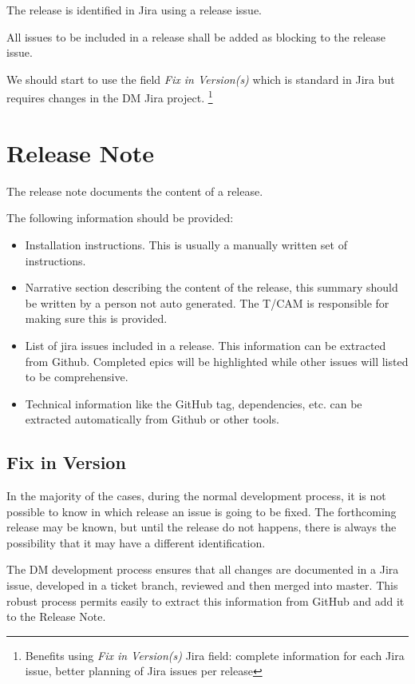 The release is identified in Jira using a release issue.

All issues to be included in a release shall be added as blocking to the release issue.

We should start to  use the field \textit{Fix in Version(s)} which is standard in Jira
but requires changes in the DM Jira project.
\footnote{Benefits using \textit{Fix in Version(s)} Jira field: complete information for each Jira issue, better planning of Jira issues per release}


\newpage
\section{Release Note} \label{sec:relnote}

The release note documents the content of a release.

The following information should be  provided:
\begin{itemize}
\item Installation instructions. This is usually a manually written set of instructions.
\item Narrative section describing the content of the release, this summary should be written by a person not auto generated.
The T/CAM is responsible for making sure this is provided.
\item List of jira issues included in a release. This information can be extracted from Github. Completed epics will be highlighted while other issues will  listed to be comprehensive.
\item Technical information like the GitHub tag, dependencies,  etc. can be extracted automatically from Github or other tools.
\end{itemize}

\subsection{Fix in Version} \label{sec:fixinver}

In the majority of the cases, during the normal development process, it is not possible to know in which release an issue is going to be fixed.
The forthcoming release may be known, but until the release do not happens, there is always the possibility that it may have a different identification.

The DM development process ensures that all changes are documented in a Jira issue, developed in a ticket branch, reviewed and then merged into master.
This robust process permits easily to extract this information from GitHub and add it to the Release Note.


